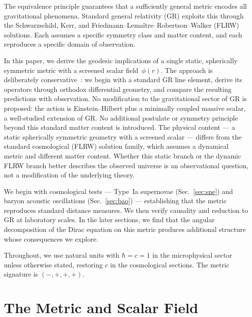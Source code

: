 \documentclass[aps,prd,twocolumn,superscriptaddress,nofootinbib,longbibliography]{revtex4-2}
\begin{document}
The equivalence principle guarantees that a sufficiently general metric
encodes all gravitational phenomena.  Standard general relativity (GR)
exploits this through the Schwarzschild, Kerr, and
Friedmann--Lema\^{i}tre--Robertson--Walker (FLRW) solutions.  Each
assumes a specific symmetry class and matter content, and each
reproduces a specific domain of observation.

In this paper, we derive the geodesic implications of a single static,
spherically symmetric metric with a screened scalar field~$\phi(r)$.
The approach is deliberately conservative~\cite{Einstein1916,BransDicke1961,Fujii2003,Sotiriou2010}: we begin with a standard GR
line element, derive its operators through orthodox differential
geometry, and compare the resulting predictions with observation.  No modification to the gravitational sector of GR is proposed: the
action is Einstein--Hilbert plus a minimally coupled massive scalar, a
well-studied extension of GR.  No additional postulate or symmetry
principle beyond this standard matter content is introduced.  The
physical content --- a static spherically symmetric geometry with a
screened scalar --- differs from the standard cosmological (FLRW)
solution family, which assumes a dynamical metric and different matter
content.  Whether this static branch or the dynamic FLRW branch better
describes the observed universe is an observational question, not a
modification of the underlying theory.

We begin with cosmological tests --- Type~Ia supernovae
(Sec.~\ref{sec:sne}) and baryon acoustic oscillations
(Sec.~\ref{sec:bao}) --- establishing that the metric reproduces
standard distance measures.  We then verify causality and reduction to
GR at laboratory scales.  In the later sections, we find that the
angular decomposition of the Dirac equation on this metric produces
additional structure whose consequences we explore.

Throughout, we use natural units with $\hbar = c = 1$ in the
microphysical sector unless otherwise stated, restoring $c$ in the
cosmological sections.  The metric signature is $(-,+,+,+)$.

\section{The Metric and Scalar Field}\label{sec:metric}
\end{document}
